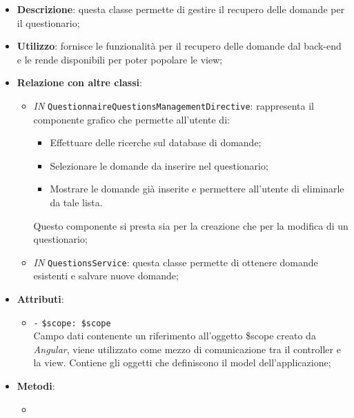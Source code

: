 \begin{itemize}
	\item \textbf{Descrizione}: questa classe permette di gestire il recupero delle domande per il questionario;
	\item \textbf{Utilizzo}: fornisce le funzionalità per il recupero delle domande dal back-end e le rende disponibili per poter popolare le view;
	\item \textbf{Relazione con altre classi}:
	\begin{itemize}
		\item \textit{IN} \texttt{QuestionnaireQuestionsManagementDirective}: rappresenta il componente grafico che permette all'utente di:
		\begin{itemize}
			\item Effettuare delle ricerche sul database di domande;
			\item Selezionare le domande da inserire nel questionario;
			\item Mostrare le domande già inserite e permettere all'utente di eliminarle da tale lista.
		\end{itemize}
		Questo componente si presta sia per la creazione che per la modifica di un questionario;
		\item \textit{IN} \texttt{QuestionsService}: questa classe permette di ottenere domande esistenti e salvare nuove domande;
	\end{itemize}
	\item \textbf{Attributi}:
	\begin{itemize}
		\item \texttt{-} \texttt{\$scope: \$scope} \\
		Campo dati contenente un riferimento all’oggetto \$scope creato da \textit{Angular}, viene utilizzato come mezzo di comunicazione tra il controller e la view. Contiene gli oggetti che definiscono il model dell’applicazione;
	\end{itemize}
	\item \textbf{Metodi}:
	\begin{itemize}
		\item 
	\end{itemize}
\end{itemize}

